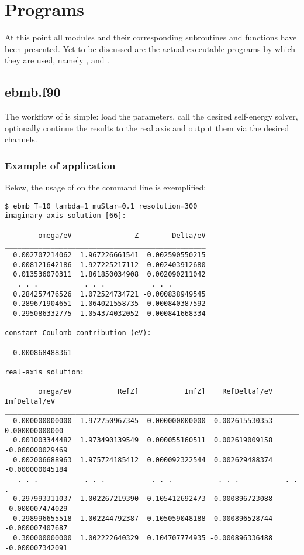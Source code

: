 

\section{Programs}

At this point all modules and their corresponding subroutines and functions have
been presented. Yet to be discussed are the actual executable programs by which
they are used, namely ,  and .

\subsection{ebmb.f90}

The workflow of  is simple: load the parameters, call the desired
self-energy solver, optionally continue the results to the real axis and output
them via the desired channels.



\subsubsection{Example of application}

Below, the usage of  on the command line is exemplified:
%
\begin{verbatim}
$ ebmb T=10 lambda=1 muStar=0.1 resolution=300
imaginary-axis solution [66]:

        omega/eV               Z        Delta/eV
________________________________________________
  0.002707214062  1.967226661541  0.002590550215
  0.008121642186  1.927225217112  0.002403912680
  0.013536070311  1.861850034908  0.002090211042
   . . .           . . .           . . .
  0.284257476526  1.072524734721 -0.000838949545
  0.289671904651  1.064021558735 -0.000840387592
  0.295086332775  1.054374032052 -0.000841668334

constant Coulomb contribution (eV):

 -0.000868488361

real-axis solution:

        omega/eV           Re[Z]           Im[Z]    Re[Delta]/eV    Im[Delta]/eV
________________________________________________________________________________
  0.000000000000  1.972750967345  0.000000000000  0.002615530353  0.000000000000
  0.001003344482  1.973490139549  0.000055160511  0.002619009158 -0.000000029469
  0.002006688963  1.975724185412  0.000092322544  0.002629488374 -0.000000045184
   . . .           . . .           . . .           . . .           . . .
  0.297993311037  1.002267219390  0.105412692473 -0.000896723088 -0.000007474029
  0.298996655518  1.002244792387  0.105059048188 -0.000896528744 -0.000007407687
  0.300000000000  1.002222640329  0.104707774935 -0.000896336488 -0.000007342091
\end{verbatim}

